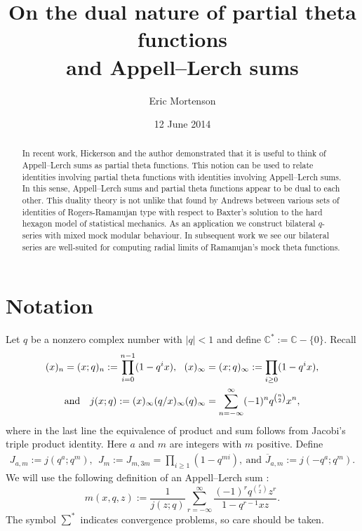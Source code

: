 \documentclass[12pt,reqno]{amsart}
\title[Partial theta functions and Appell--Lerch sums]{On the dual nature of partial theta functions\\ and Appell--Lerch sums}
\author{Eric Mortenson}
\theoremstyle{remark}
\theoremstyle{definition}
\numberwithin{theorem}{section} \numberwithin{equation}{section}
\numberwithin{example}{section}
\begin{document}
\date{12 June 2014}



\begin{abstract}
In recent work, Hickerson and the author demonstrated that it is useful to think of Appell--Lerch sums as partial theta functions.  This notion can be used to relate identities involving partial theta functions with identities involving Appell--Lerch sums.  In this sense, Appell--Lerch sums and partial theta functions appear to be dual to each other.  This duality theory is not unlike that found by Andrews between various sets of identities of Rogers-Ramanujan type with respect to Baxter's solution to the hard hexagon model of statistical mechanics.  As an application we construct bilateral $q$-series with mixed mock modular behaviour.  In subsequent work we see our bilateral series are well-suited for computing radial limits of Ramanujan's mock theta functions.
\end{abstract}

\address{School of Mathematics and Physics, University of Queensland, Brisbane 4072}
\address{Max-Planck-Institut f\"ur Mathematik, Vivatsgasse 7, 53111 Bonn, Germany}
\maketitle
\setcounter{section}{-1}

\section{Notation}\label{section:notation}

 Let $q$ be a nonzero complex number with $|q|<1$ and define $\mathbb{C}^*:=\mathbb{C}-\{0\}$.  Recall
\begin{gather}
(x)_n=(x;q)_n:=\prod_{i=0}^{n-1}(1-q^ix), \ \ (x)_{\infty}=(x;q)_{\infty}:=\prod_{i\ge 0}(1-q^ix),\notag \\
{\text{and }} \ \ j(x;q):=(x)_{\infty}(q/x)_{\infty}(q)_{\infty}=\sum_{n=-\infty}^{\infty}(-1)^nq^{\binom{n}{2}}x^n,\label{equation:theta-def}
\end{gather}
where in the last line the equivalence of product and sum follows from Jacobi's triple product identity.    Here $a$ and $m$ are integers with $m$ positive.  Define
\begin{gather*}
J_{a,m}:=j(q^a;q^m), \ \ J_m:=J_{m,3m}=\prod_{i\ge 1}(1-q^{mi}), \ {\text{and }}\overline{J}_{a,m}:=j(-q^a;q^m).
\end{gather*}
We will use the following definition of an Appell--Lerch sum \cite{HM}:
\begin{equation}
m(x,q,z):=\frac{1}{j(z;q)}\sum_{r=-\infty}^{\infty}\frac{(-1)^rq^{\binom{r}{2}}z^r}{1-q^{r-1}xz}.\label{equation:mdef-eq}
\end{equation}
The symbol $\sum^{\ast}$ indicates convergence problems, so care should be taken.
\end{document}
